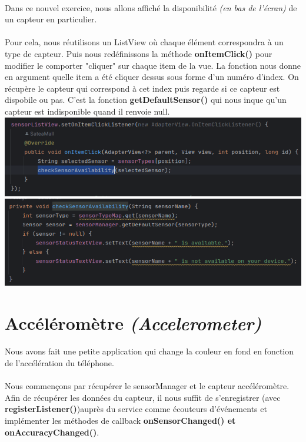 \documentclass[a4paper]{article}
\begin{document}
\begin{multicols}{2}
            \paragraph{}
                Dans ce nouvel exercice, nous allons affiché la disponibilité \emph{(en bas de l'écran)} de un capteur en particulier.
            \paragraph{}
                Pour cela, nous réutilisons un ListView où chaque élément correspondra à un type de capteur. Puis nous redéfinissons la méthode \textbf{onItemClick()} pour modifier le comporter "cliquer" sur chaque item de la vue. La fonction nous donne en argument quelle item a été cliquer dessus sous forme d'un numéro d'index. On récupère le capteur qui correspond à cet index puis regarde si ce capteur est dispobile ou pas. C'est la fonction \textbf{getDefaultSensor()} qui nous inque qu'un capteur est indisponible quand il renvoie null.
                \includegraphics[width=.49\textwidth]{dispo/click}
                \includegraphics[width=.49\textwidth]{dispo/check}
        \section{Accéléromètre \emph{(Accelerometer)}}
            \paragraph{}
                Nous avons fait une petite application qui change la couleur en fond en fonction de l'accélération du téléphone.
            \paragraph{}
                Nous commençons par récupérer le sensorManager et le capteur accéléromètre. Afin de récupérer les données du capteur, il nous suffit de s'enregistrer (avec \textbf{registerListener()})auprès du service comme écouteurs d'événements et implémenter les méthodes de callback \textbf{onSensorChanged() et onAccuracyChanged()}.


\end{multicols}
\end{document}
